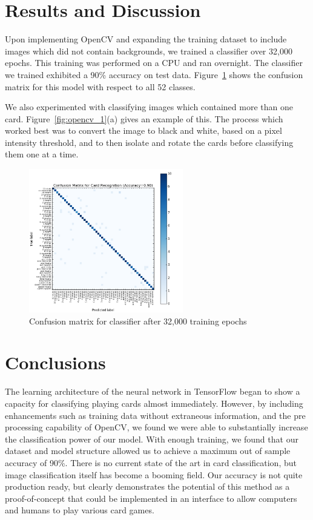 \documentclass[letterpaper]{article}
\begin{document}
\section{Results and Discussion}
Upon implementing OpenCV and expanding the training dataset to include images which did not contain backgrounds, we trained a classifier over 32,000 epochs. This training was performed on a CPU and ran overnight. 
The classifier we trained exhibited a 90\% accuracy on test data. Figure~\ref{fig:confus} shows the confusion matrix for this model with respect to all 52 classes.

We also experimented with classifying images which contained more than one card. Figure~\ref{fig:opencv_1}(a) gives an example of this. The process which worked best was to convert the image to black and white, based on a pixel intensity threshold, and to then isolate and rotate the cards before classifying them one at a time.
\begin{figure}[!tbp]
\centering
\includegraphics[width=0.6\textwidth]{results/confusion.png}
\caption{\label{fig:confus}Confusion matrix for classifier after 32,000 training epochs}
\end{figure}
\section{Conclusions}
The learning architecture of the neural network in TensorFlow began to show a capacity for classifying playing cards almost immediately. However, by including enhancements such as training data without extraneous information, and the pre processing capability of OpenCV, we found we were able to substantially increase the classification power of our model. With enough training, we found that our dataset and model structure allowed us to achieve a maximum out of sample accuracy of 90\%. There is no current state of the art in card classification, but image classification itself has become a booming field. Our accuracy is not quite production ready, but clearly demonstrates the potential of this method as a proof-of-concept that could be implemented in an interface to allow computers and humans to play various card games.

\nocite{*}


\end{document}

